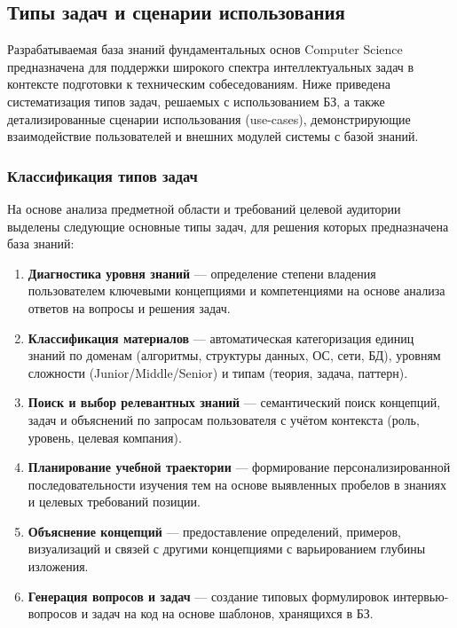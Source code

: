 \subsection{Типы задач и сценарии использования}
\label{subsec:tasks-scenarios}

Разрабатываемая база знаний фундаментальных основ Computer Science предназначена для поддержки широкого спектра интеллектуальных задач в контексте подготовки к техническим собеседованиям. Ниже приведена систематизация типов задач, решаемых с использованием БЗ, а также детализированные сценарии использования (use-cases), демонстрирующие взаимодействие пользователей и внешних модулей системы с базой знаний.

\subsubsection*{Классификация типов задач}

На основе анализа предметной области и требований целевой аудитории выделены следующие основные типы задач, для решения которых предназначена база знаний:

\begin{enumerate}
    \item \textbf{Диагностика уровня знаний} — определение степени владения пользователем ключевыми концепциями и компетенциями на основе анализа ответов на вопросы и решения задач.
    
    \item \textbf{Классификация материалов} — автоматическая категоризация единиц знаний по доменам (алгоритмы, структуры данных, ОС, сети, БД), уровням сложности (Junior/Middle/Senior) и типам (теория, задача, паттерн).
    
    \item \textbf{Поиск и выбор релевантных знаний} — семантический поиск концепций, задач и объяснений по запросам пользователя с учётом контекста (роль, уровень, целевая компания).
    
    \item \textbf{Планирование учебной траектории} — формирование персонализированной последовательности изучения тем на основе выявленных пробелов в знаниях и целевых требований позиции.
    
    \item \textbf{Объяснение концепций} — предоставление определений, примеров, визуализаций и связей с другими концепциями с варьированием глубины изложения.
    
    \item \textbf{Генерация вопросов и задач} — создание типовых формулировок интервью-вопросов и задач на код на основе шаблонов, хранящихся в БЗ.
\end{enumerate}

